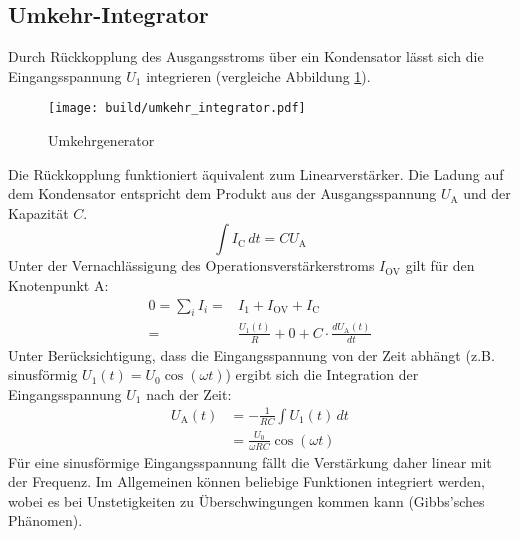 \subsection{Umkehr-Integrator}%
\label{sub:umkehr_integrator}

Durch Rückkopplung des Ausgangsstroms über ein Kondensator lässt sich die
Eingangsspannung $U_1$ integrieren (vergleiche Abbildung \ref{fig:integrator}).
\begin{figure}[h]
		\centering
		\texttt{[image: build/umkehr\_integrator.pdf]}
		\caption{Umkehrgenerator \cite{anleitung}}
		\label{fig:integrator}
\end{figure}
Die Rückkopplung funktioniert äquivalent zum Linearverstärker.
Die Ladung auf dem Kondensator entspricht dem Produkt aus der Ausgangsspannung
$U_\text{A}$ und der Kapazität $C$.
\begin{equation}
		\int I_\text{C} \, dt = C U_\text{A}
\end{equation}
Unter der Vernachlässigung des Operationsverstärkerstroms $I_\text{OV}$ gilt
für den Knotenpunkt A:
\begin{align}
		0 = \sum_i I_i =& I_1 + I_\text{OV} + I_\text{C} \\
		=& \frac{U_1(t)}{R} + 0 + C \cdot \frac{d U_\text{A}(t)}{dt}
\end{align}
Unter Berücksichtigung, dass die Eingangsspannung von der Zeit abhängt (z.B.
sinusförmig $U_1(t)= U_0 \cos(\omega t)$) ergibt sich die Integration der Eingangsspannung $U_1$ nach der Zeit:
\begin{align}
  \label{eq:integrator_before} U_\text{A}(t) &= - \frac{1}{RC} \int U_\text{1}(t) \, dt \\
                  &= \frac{U_0}{\omega R C} \cos (\omega t) \label{eq:integrator}
\end{align}
Für eine sinusförmige Eingangsspannung fällt die Verstärkung daher linear mit
der Frequenz.
Im Allgemeinen können beliebige Funktionen integriert werden, wobei es bei
Unstetigkeiten zu Überschwingungen kommen kann (Gibbs'sches Phänomen).

